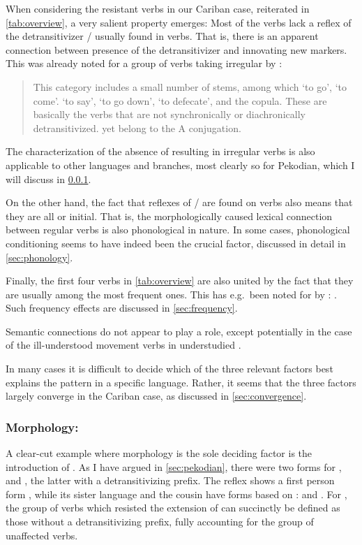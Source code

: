 When considering the resistant verbs in our Cariban case, reiterated in \cref{tab:overview}, a very salient property emerges:
Most of the verbs lack a reflex of the detransitivizer / usually found in   verbs.
That is, there is an apparent connection between presence of the detransitivizer and innovating new  markers.
This was already noted for a group of \PTar verbs taking irregular  by \textcite[112]{meira1998proto}:
\begin{quotation}
	This category includes a small number of stems, among which ‘to go’, ‘to come’. ‘to say’, ‘to go down’, ‘to defecate', and the copula. These are basically the verbs that are not synchronically or diachronically detransitivized. yet belong to the A conjugation.
\end{quotation}
The characterization of the absence of \detrz resulting in irregular verbs is also applicable to other languages and branches, most clearly so for Pekodian, which I will discuss in \cref{sec:morphology}.

On the other hand, the fact that reflexes of / are found on   verbs also means that they are all  or  initial.
That is, the morphologically caused lexical connection between regular  verbs is also phonological in nature.
In some cases, phonological conditioning seems to have indeed been the crucial factor, discussed in detail in \cref{sec:phonology}.

Finally, the first four verbs in \cref{tab:overview} are also united by the fact that they are usually among the most frequent ones.
This has e.g.\ been noted for \kalina by \textcite[75]{courtz2008carib}: .
Such frequency effects are discussed in \cref{sec:frequency}.

Semantic connections do not appear to play a role, except potentially in the case of the ill-understood movement verbs in understudied \akuriyo.

In many cases it is difficult to decide which of the three relevant factors best explains the pattern in a specific language.
Rather, it seems that the three factors largely converge in the Cariban case, as discussed in \cref{sec:convergence}.


\subsubsection{Morphology: \PPek}
\label{sec:morphology}
A clear-cut example where morphology is the sole deciding factor is the introduction of \PPek {}.
As I have argued in \cref{sec:pekodian}, there were two forms for ,  and , the latter with a detransitivizing prefix.
The \arara reflex shows a first person form , while its sister language \ikpeng and the cousin \bakairi have forms based on :  and .
For \PPek, the group of verbs which resisted the extension of  can succinctly be defined as those without a detransitivizing prefix, fully accounting for the group of unaffected verbs.

